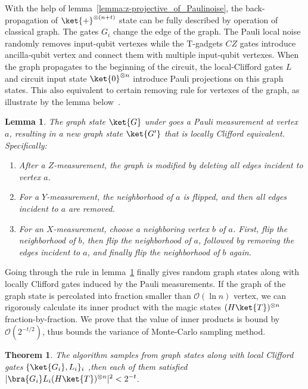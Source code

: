 \documentclass[aps,%
twocolumn,%
floatfix,%
pra,%
amsfonts,%
longbibliography,%
groupedaddress,%
superscriptaddress]{revtex4-2}%
\newtheorem{theorem}{Theorem}
\newtheorem{lemma}{Lemma}
\newcommand{\1}{\mathbbm{1}}
\begin{document}
With the help of lemma~\ref{lemma:z-projective_of_Paulinoise}, the back-propagation of  $\ket{+}^{\otimes (n+t)}$ state can be fully described by operation of classical graph. The gates $G_i$ change the edge of the graph. The Pauli local noise randomly removes input-qubit vertexes while the T-gadgets $CZ$ gates introduce ancilla-qubit vertex and connect them with multiple input-qubit vertexes. When the graph propagates to the beginning of the circuit, the local-Clifford gates $L$ and circuit input state $\ket{0}^{\otimes n}$ introduce Pauli projections on this graph states. This also equivalent to certain removing rule for vertexes of the graph, as illustrate by the lemma below~\cite{mor2023noisy}.
\begin{lemma}\label{lemma:Pauli_measurement_on_graph}
    The graph state $\ket{G}$ under goes a Pauli measurement at vertex $a$, resulting in a new graph state $\ket{G'}$ that is locally Clifford equivalent. Specifically:
\begin{enumerate}
    \item After a $Z$-measurement, the graph is modified by deleting all edges incident to vertex $a$.
    \item For a $Y$-measurement, the neighborhood of $a$ is flipped, and then all edges incident to $a$ are removed.
    \item For an $X$-measurement, choose a neighboring vertex $b$ of $a$. First, flip the neighborhood of $b$, then flip the neighborhood of $a$, followed by removing the edges incident to $a$, and finally flip the neighborhood of $b$ again.
\end{enumerate}
\end{lemma}
Going through the rule in lemma~\ref{lemma:Pauli_measurement_on_graph} finally gives random graph states along with locally Clifford gates induced by the Pauli measurements.
If the graph of the graph state is percolated into fraction smaller than $\mathcal{O}(\ln n)$ vertex, we can rigorously calculate its inner product with the magic states $(H\ket{T})^{\otimes n}$  fraction-by-fraction.   
We prove that the value of inner products is bound by $\mathcal{O}(2^{-t/2})$, thus bounds the variance of Monte-Carlo sampling method.
\begin{theorem}\label{theo:variance_of_percolation_sampling}
    The algorithm samples from graph states along with local Clifford gates $\{\ket{G_i},L_i\}_i$ ,then each of them satisfied $|\bra{G_i}L_i(H\ket{T})^{\otimes n}|^2 < 2^{-t}$.   
\end{theorem}
\end{document}
